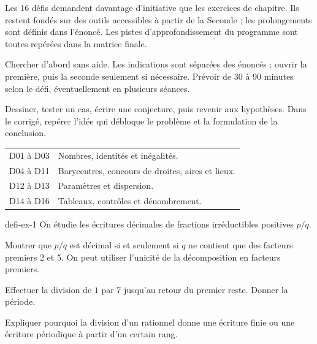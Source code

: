 \clearpage\gdef\otChapNum{0}\pagestyle{otFront}\label{defis-debut}
Les 16 défis demandent davantage d’initiative que les exercices de chapitre. Ils restent fondés sur des outils accessibles à partir de la Seconde ; les prolongements sont définis dans l’énoncé. Les pistes d’approfondissement du programme sont toutes repérées dans la matrice finale.\par\medskip
Chercher d’abord sans aide. Les indications sont séparées des énoncés ; ouvrir la première, puis la seconde seulement si nécessaire. Prévoir de 30 à 90 minutes selon le défi, éventuellement en plusieurs séances.\par\medskip
\begin{savoirfaire}Dessiner, tester un cas, écrire une conjecture, puis revenir aux hypothèses. Dans le corrigé, repérer l’idée qui débloque le problème et la formulation de la conclusion.\end{savoirfaire}
\begin{tabularx}{\linewidth}{@{}lY@{}}\toprule
D01 à D03 & Nombres, identités et inégalités.\\[2mm]
D04 à D11 & Barycentres, concours de droites, aires et lieux.\\[2mm]
D12 à D13 & Paramètres et dispersion.\\[2mm]
D14 à D16 & Tableaux, contrôles et dénombrement.\\\bottomrule
\end{tabularx}
\begin{blocEdition}{defi-ex-1}
On étudie les écritures décimales de fractions irréductibles positives $p/q$.
\begin{questions}
\item Montrer que $p/q$ est décimal si et seulement si $q$ ne contient que des facteurs premiers 2 et 5. On peut utiliser l’unicité de la décomposition en facteurs premiers.
\item Effectuer la division de $1$ par 7 jusqu’au retour du premier reste. Donner la période.
\item Expliquer pourquoi la division d’un rationnel donne une écriture finie ou une écriture périodique à partir d’un certain rang.
\end{questions}
\end{blocEdition}
